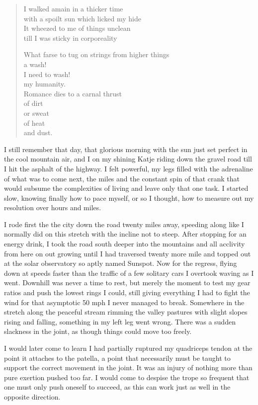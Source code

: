 \documentclass[ebook, 10pt, openright, onecolumn]{memoir}
\newenvironment{poetry}
{
  \begin{quote}
    \begin{itshape}
      \small
    }
    {
    \end{itshape}
  \end{quote}
}
\begin{document}
\begin{poetry}
  I walked amain in a thicker time\\
  with a spoilt sun which licked my hide\\
  It wheezed to me of things unclean\\
  till I was sticky in corporeality

  What farse to tug on strings from higher things\\
  a wash!\\
  I need to wash!\\
  my humanity.\\
  Romance dies to a carnal thrust\\
  of dirt\\or sweat\\of heat\\and dust.\\
\end{poetry}


I still remember that day, that glorious morning with the sun just set perfect
in the cool mountain air, and I on my shining Katje riding down the gravel road
till I hit the asphalt of the highway.  I felt powerful, my legs filled with the
adrenaline of what was to come next, the miles and the constant spin of that
crank that would subsume the complexities of living and leave only that one
task.  I started slow, knowing finally how to pace myself, or so I thought, how
to measure out my resolution over hours and miles.

I rode first the the city down the road twenty miles away, speeding along like I
normally did on this stretch with the incline not to steep.  After stopping for
an energy drink, I took the road south deeper into the mountains and all
acclivity from here on out growing until I had traversed twenty more mile and
topped out at the solar observatory so aptly named Sunspot.  Now for the
regress, flying down at speeds faster than the traffic of a few solitary cars I
overtook waving as I went.  Downhill was never a time to rest, but merely the
moment to test my gear ratios and push the lowest rings I could, still giving
everything I had to fight the wind for that asymptotic 50 mph I never managed to
break.  Somewhere in the stretch along the peaceful stream rimming the valley
pastures with slight slopes rising and falling, something in my left leg went
wrong.  There was a sudden slackness in the joint, as though things could move
too freely.

I would later come to learn I had partially ruptured my quadriceps tendon at the
point it attaches to the patella, a point that necessarily must be taught to
support the correct movement in the joint.  It was an injury of nothing more
than pure exertion pushed too far.  I would come to despise the trope so
frequent that one must only push oneself to succeed, as this can work just as
well in the opposite direction.
\end{document}

